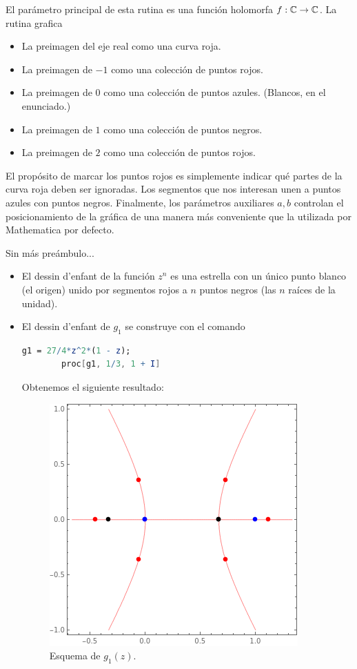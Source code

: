 \begin{solution}
\begin{itemize}
    El parámetro principal de esta rutina es una función holomorfa $f : \mathbb C \to \mathbb C$. La rutina grafica
    \begin{itemize}
        \item La preimagen del eje real como una curva roja.
        \item La preimagen de $-1$ como una colección de puntos rojos.
        \item La preimagen de $0$ como una colección de puntos azules. (Blancos, en el enunciado.)
        \item La preimagen de $1$ como una colección de puntos negros.
        \item La preimagen de $2$ como una colección de puntos rojos.
    \end{itemize}
    
    El propósito de marcar los puntos rojos es simplemente indicar qué partes de la curva roja deben ser ignoradas. Los segmentos que nos interesan unen a puntos azules con puntos negros. Finalmente, los parámetros auxiliares $a, b$ controlan el posicionamiento de la gráfica de una manera más conveniente que la utilizada por Mathematica por defecto.
    
    Sin más preámbulo...
    
    \begin{itemize}
        \item El dessin d'enfant de la función $z^n$ es una estrella con un único punto blanco (el origen) unido por segmentos rojos a $n$ puntos negros (las $n$ raíces de la unidad).
        
        \item El dessin d'enfant de $g_1$ se construye con el comando
        \begin{lstlisting}[language=Mathematica]
        g1 = 27/4*z^2*(1 - z);
        proc[g1, 1/3, 1 + I]
        \end{lstlisting}
        
        Obtenemos el siguiente resultado:
        \begin{figure}[h]
            \centering
            \includegraphics[scale=0.4]{dessins/g1.png}
            \caption{Esquema de $g_1(z)$.}
        \end{figure}
        

\end{itemize}
\end{itemize}
\end{solution}
